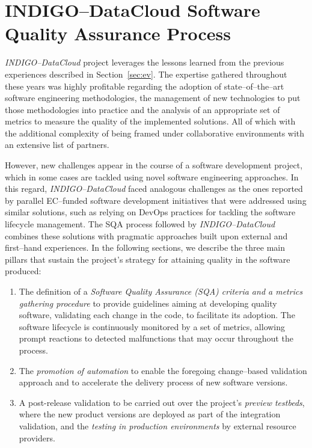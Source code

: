 \section{INDIGO--DataCloud Software Quality Assurance Process}
\label{sec:ntsr}

{\sl INDIGO--DataCloud} project \cite{salomoni2018indigo} %
leverages the lessons learned from the previous experiences described in
Section~\ref{sec:ev}. The expertise gathered throughout these years was highly
profitable regarding the adoption of state--of--the--art software engineering
methodologies, the management of new technologies to put those methodologies
into practice and the analysis of an appropriate set of metrics to measure the
quality of the implemented solutions. All of which with the additional complexity of
being framed under collaborative environments with an extensive list of partners.

However, new challenges appear in the course of a software development project, which in some
cases are tackled using novel software engineering approaches. In this regard, 
{\sl INDIGO--DataCloud} faced analogous challenges as the ones reported by parallel EC--funded 
software development initiatives \cite{casale2016current} that were addressed using similar 
solutions, such as relying on DevOps practices for tackling the software lifecycle management. 
The SQA process followed by {\sl INDIGO--DataCloud}
combines these solutions with pragmatic approaches built upon external and first--hand 
experiences. In the following sections, we describe the three main pillars that sustain the
project's strategy for attaining quality in the software produced:

\begin{enumerate}
    \item The definition of a \textit{Software Quality Assurance (SQA) criteria and a metrics gathering procedure} to provide guidelines
    aiming at developing quality software, validating each change in the code, to facilitate its adoption. The software lifecycle is
    continuously monitored by a set of metrics, allowing prompt reactions to detected malfunctions that may occur throughout the process.
    \item The \textit{promotion of automation} to enable the foregoing change--based validation approach and to accelerate the delivery
    process of new software versions.
    \item A post-release validation to be carried out over the project's \textit{preview testbeds}, where the new product versions
    are deployed as part of the integration validation, and the \textit{testing in production environments} by external resource providers.
\end{enumerate}

